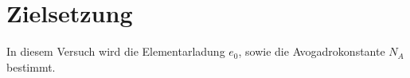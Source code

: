 \section{Zielsetzung}

In diesem Versuch wird die Elementarladung $e_0$, sowie die Avogadrokonstante $N_A$ bestimmt. 
